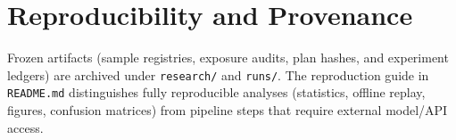 \documentclass[11pt,a4paper]{article}
\begin{document}
\section{Reproducibility and Provenance} \label{sec:repro}

Frozen artifacts (sample registries, exposure audits, plan hashes, and
experiment ledgers) are archived under \texttt{research/} and \texttt{runs/}.
The reproduction guide in \texttt{README.md} distinguishes fully reproducible
analyses (statistics, offline replay, figures, confusion matrices) from
pipeline steps that require external model/API access.
\end{document}
